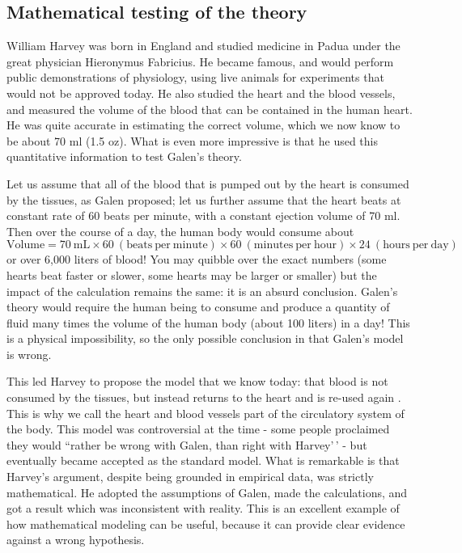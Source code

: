 \documentclass[
]{book}
\theoremstyle{definition}
\theoremstyle{definition}
\theoremstyle{definition}
\theoremstyle{remark}
\begin{document}
\hypertarget{mathematical-testing-of-the-theory}{%
\subsection{Mathematical testing of the theory}\label{mathematical-testing-of-the-theory}}

William Harvey  was born in England and studied medicine in Padua under the great physician Hieronymus Fabricius. He became famous, and would perform public demonstrations of physiology, using live animals for experiments that would not be approved today. He also studied the heart and the blood vessels, and measured the volume of the blood that can be contained in the human heart. He was quite accurate in estimating the correct volume, which we now know to be about 70 ml (1.5 oz). What is even more impressive is that he used this quantitative information to test Galen's theory.

Let us assume that all of the blood that is pumped out by the heart is consumed by the tissues, as Galen proposed; let us further assume that the heart beats at constant rate of 60 beats per minute, with a constant ejection volume of 70 ml. Then over the course of a day, the human body would consume about
\[\mathrm{Volume} = 70 \ \mathrm {mL} \times 60 \ \mathrm {(beats \ per \ minute)} \times 60 \ \mathrm {(minutes \ per \ hour)}  \times 24 \ \mathrm {(hours \ per \ day)}\]
or over 6,000 liters of blood! You may quibble over the exact numbers (some hearts beat faster or slower, some hearts may be larger or smaller) but the impact of the calculation remains the same: it is an absurd conclusion. Galen's theory would require the human being to consume and produce a quantity of fluid many times the volume of the human body (about 100 liters) in a day! This is a physical impossibility, so the only possible conclusion in that Galen's model is wrong.

This led Harvey to propose the model that we know today: that blood is not consumed by the tissues, but instead returns to the heart and is re-used again \citep{schultz_william_2002}. This is why we call the heart and blood vessels part of the circulatory system of the body. This model was controversial at the time - some people proclaimed they would ``rather be wrong with Galen, than right with Harvey'\,' - but eventually became accepted as the standard model. What is remarkable is that Harvey's argument, despite being grounded in empirical data, was strictly mathematical. He adopted the assumptions of Galen, made the calculations, and got a result which was inconsistent with reality. This is an excellent example of how mathematical modeling can be useful, because it can provide clear evidence against a wrong hypothesis.
\end{document}
